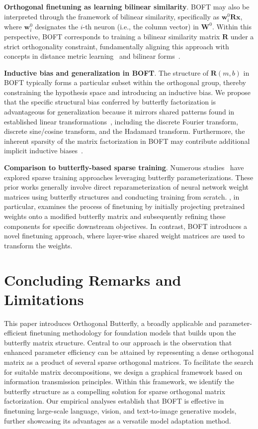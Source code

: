 \textbf{Orthogonal finetuning as learning bilinear similarity}. BOFT may also be interpreted through the framework of bilinear similarity, specifically as $\bm{w}^0_i\bm{R}\bm{x}$, where $\bm{w}^0_i$ designates the $i$-th neuron (i.e., the column vector) in $\bm{W}^0$. Within this perspective, BOFT corresponds to training a bilinear similarity matrix $\bm{R}$ under a strict orthogonality constraint, fundamentally aligning this approach with concepts in distance metric learning~\cite{xing2002distance} and bilinear forms~\cite{roman2005advanced}.

\textbf{Inductive bias and generalization in BOFT}. The structure of $\bm{R}(m,b)$ in BOFT typically forms a particular subset within the orthogonal group, thereby constraining the hypothesis space and introducing an inductive bias. We propose that the specific structural bias conferred by butterfly factorization is advantageous for generalization because it mirrors shared patterns found in established linear transformations~\cite{dao2019kaleidoscope}, including the discrete Fourier transform, discrete sine/cosine transform, and the Hadamard transform. Furthermore, the inherent sparsity of the matrix factorization in BOFT may contribute additional implicit inductive biases~\cite{gunasekar2017implicit, li2018algorithmic, liu2019neural}.

\textbf{Comparison to butterfly-based sparse training}. Numerous studies~\cite{dao2019learning,dao2019kaleidoscope,chen2022pixelated,dao2022monarch} have explored sparse training approaches leveraging butterfly parameterizations. These prior works generally involve direct reparameterization of neural network weight matrices using butterfly structures and conducting training from scratch. \cite{dao2022monarch}, in particular, examines the process of finetuning by initially projecting pretrained weights onto a modified butterfly matrix and subsequently refining these components for specific downstream objectives. In contrast, BOFT introduces a novel finetuning approach, where layer-wise shared weight matrices are used to transform the weights.



\section{Concluding Remarks and Limitations}

This paper introduces Orthogonal Butterfly, a broadly applicable and parameter-efficient finetuning methodology for foundation models that builds upon the butterfly matrix structure. Central to our approach is the observation that enhanced parameter efficiency can be attained by representing a dense orthogonal matrix as a product of several sparse orthogonal matrices. To facilitate the search for suitable matrix decompositions, we design a graphical framework based on information transmission principles. Within this framework, we identify the butterfly structure as a compelling solution for sparse orthogonal matrix factorization. Our empirical analyses establish that BOFT is effective in finetuning large-scale language, vision, and text-to-image generative models, further showcasing its advantages as a versatile model adaptation method.

